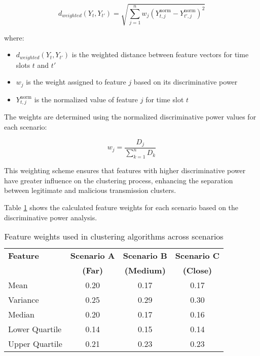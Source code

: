 \begin{equation}
    d_{weighted}(Y_t, Y_{t'}) = \sqrt{\sum_{j=1}^{n} w_j (Y_{t,j}^{\text{norm}} - Y_{t',j}^{\text{norm}})^2}
\end{equation}

where:
\begin{itemize}
    \item $d_{weighted}(Y_t, Y_{t'})$ is the weighted distance between feature vectors for time slots $t$ and $t'$
    \item $w_j$ is the weight assigned to feature $j$ based on its discriminative power
    \item $Y_{t,j}^{\text{norm}}$ is the normalized value of feature $j$ for time slot $t$
\end{itemize}

The weights are determined using the normalized discriminative power values for each scenario:

\begin{equation}
    w_j = \frac{D_j}{\sum_{k=1}^{n} D_k}
\end{equation}

This weighting scheme ensures that features with higher discriminative power have greater influence on the clustering process, enhancing the separation between legitimate and malicious transmission clusters.

Table \ref{tab:feature_weights} shows the calculated feature weights for each scenario based on the discriminative power analysis.

\begin{table}[htbp]
    \centering
    \caption{Feature weights used in clustering algorithms across scenarios}
    \label{tab:feature_weights}
    \begin{tabular}{lccc}
        \toprule
        \textbf{Feature} & \textbf{Scenario A} & \textbf{Scenario B} & \textbf{Scenario C} \\
        & \textbf{(Far)} & \textbf{(Medium)} & \textbf{(Close)} \\
        \midrule
        Mean & 0.20 & 0.17 & 0.17 \\
        Variance & 0.25 & 0.29 & 0.30 \\
        Median & 0.20 & 0.17 & 0.16 \\
        Lower Quartile & 0.14 & 0.15 & 0.14 \\
        Upper Quartile & 0.21 & 0.23 & 0.23 \\
        \bottomrule
    \end{tabular}
\end{table}

